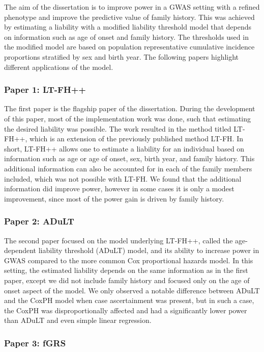 The aim of the dissertation is to improve power in a GWAS setting with a refined phenotype and improve the predictive value of family history. This was achieved by estimating a liability with a modified liability threshold model that depends on information such as age of onset and family history. The thresholds used in the modified model are based on population representative cumulative incidence proportions stratified by sex and birth year. The following papers highlight different applications of the model.


\subsubsection{Paper 1: LT-FH++}
The first paper is the flagship paper of the dissertation. During the development of this paper, most of the implementation work was done, such that estimating the desired liability was possible. The work resulted in the method titled LT-FH++, which is an extension of the previously published method LT-FH. In short, LT-FH++ allows one to estimate a liability for an individual based on information such as age or age of onset, sex, birth year, and family history. This additional information can also be accounted for in each of the family members included, which was not possible with LT-FH. We found that the additional information did improve power, however in some cases it is only a modest improvement, since most of the power gain is driven by family history.

\subsubsection{Paper 2: ADuLT}
The second paper focused on the model underlying LT-FH++, called the age-dependent liability threshold (ADuLT) model, and its ability 
to increase power in GWAS compared to the more common Cox proportional hazards model. In this setting, the estimated liability depends 
on the same information as in the first paper, except we did not include family history and focused only on the age of onset aspect of 
the model. We only observed a notable difference between ADuLT and the CoxPH model when case ascertainment was present, but in such a 
case, the CoxPH was disproportionally affected and had a significantly lower power than ADuLT and even simple linear regression.

\subsubsection{Paper 3: fGRS}
